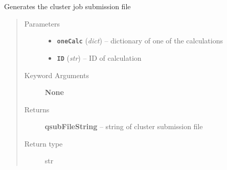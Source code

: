 \documentclass[letterpaper,10pt,english]{sphinxmanual}
\begin{document}
\begin{fulllineitems}
\label{run:run.__qsubGen}
Generates the cluster job submission file
\begin{quote}\begin{description}
\item[{Parameters}] \leavevmode\begin{itemize}
\item {} 
\textbf{\texttt{oneCalc}} (\emph{dict}) -- dictionary of one of the calculations

\item {} 
\textbf{\texttt{ID}} (\emph{str}) -- ID of calculation

\end{itemize}

\item[{Keyword Arguments}] \leavevmode
\textbf{None}

\item[{Returns}] \leavevmode
\textbf{qsubFileString} --
string of cluster submission file

\item[{Return type}] \leavevmode
str

\end{description}\end{quote}

\end{fulllineitems}

\end{document}
